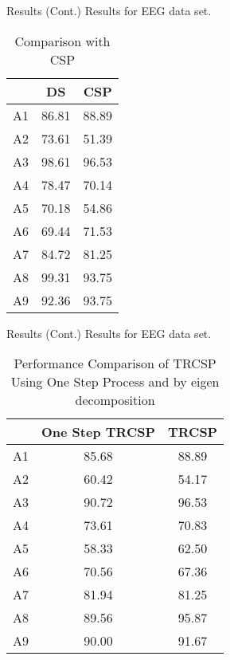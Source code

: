 \documentclass[11pt]{beamer}
\begin{document}
\begin{frame}{Results (Cont.)}
Results for EEG data set.
\begin{table}
 \caption {Comparison with CSP}
 \centering
    \begin{tabular}{|c|c|c|}
    \hline
    ~  & DS    & CSP   \\ \hline
    A1 & 86.81 & 88.89 \\ \hline
    A2 & 73.61 & 51.39 \\ \hline
    A3 & 98.61 & 96.53 \\ \hline
    A4 & 78.47 & 70.14 \\ \hline
    A5 & 70.18 & 54.86 \\ \hline
    A6 & 69.44 & 71.53 \\ \hline
    A7 & 84.72 & 81.25 \\ \hline
    A8 & 99.31 & 93.75 \\ \hline
    A9 & 92.36 & 93.75 \\ \hline
    \end{tabular}
   
    \label{akb3}
\end{table}
 \end{frame}
\begin{frame}{Results (Cont.)}
Results for EEG data set.
\begin{table}
\centering
\caption {Performance Comparison of TRCSP Using One Step Process and by eigen decomposition}
    \begin{tabular}{|c|c|c|}
    \hline
    ~  & One Step TRCSP   & TRCSP \\ \hline
    A1 & 85.68 & 88.89 \\ \hline
    A2 & 60.42 & 54.17 \\ \hline
    A3 & 90.72 & 96.53 \\ \hline
    A4 & 73.61 & 70.83 \\ \hline
    A5 & 58.33 & 62.50 \\ \hline
    A6 & 70.56 & 67.36 \\ \hline
    A7 & 81.94 & 81.25 \\ \hline
    A8 & 89.56 & 95.87 \\ \hline
    A9 & 90.00 & 91.67 \\ \hline
    \end{tabular}
    \label{tabcomp}
\end{table}
 \end{frame}
\end{document}
